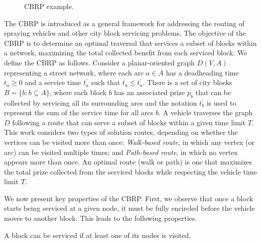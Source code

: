 {\begin{figure}[h!]
  \begin{minipage}[c]{.49\textwidth}
    \centering
  \end{minipage}%
  \begin{minipage}[c]{.49\textwidth}
    \centering
  \end{minipage}
  \caption{\label{fig:route-ex} CBRP example.}
\end{figure}

The CBRP is introduced as a general framework for addressing the routing of spraying vehicles and other city block servicing problems. The objective of the CBRP is to determine an optimal traversal that services a subset of blocks within a network, maximizing the total collected benefit from each serviced block. We define the CBRP as follows. Consider a planar-oriented graph $D(V,A)$ representing a street network, where each arc $a \in A$ has a deadheading time $t_a \geqslant 0$ and a service time $t^{'}_a$ such that $t_a \leqslant t^{'}_a$. There is a set of city blocks $B = \{b : b \subseteq A\}$, where each block $b$ has an associated prize $p_b$ that can be collected by servicing all its surrounding arcs and the notation $t^{'}_b$ is used to represent the sum of the service time for all arcs $b$. A vehicle traverses the graph $D$ following a route that can serve a subset of blocks within a given time limit $T$. This work considers two types of solution routes, depending on whether the vertices can be visited more than once: \textit{Walk-based route}, in which any vertex (or arc) can be visited multiple times; and \textit{Path-based route}, in which no vertex appears more than once. An optimal route (walk or path) is one that maximizes the total prize collected from the serviced blocks while respecting the vehicle time limit $T$.

We now present key properties of the CBRP. First, we observe that once a block starts being serviced at a given node, it must be fully encircled before the vehicle moves to another block. This leads to the following properties.

\begin{property}
\label{claim:core_insight}
A block can be serviced if at least one of its nodes is visited.
\end{property}

}
